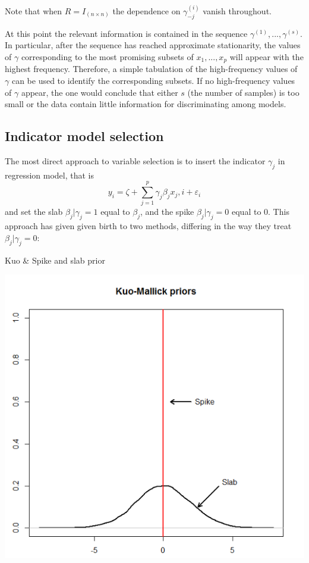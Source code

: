 \documentclass[11 pt]{article}
\begin{document}
\begin{multicols}{2}
\begin{enumerate}[noitemsep]
\begin{align*}
    \end{align*}
 Note that when $R = I_{(n\times n)}$ the dependence on $\gamma_{-j}^{(i)}$ vanish throughout.
\end{enumerate}
At this point the relevant information is contained in the sequence $\gamma^{(1)},...,\gamma^{(s)}$. In particular, after the sequence has reached approximate stationarity, the values of $\gamma$ corresponding to the most promising subsets of $x_1,...,x_p$ will appear with the highest frequency. Therefore, a simple tabulation of the high-frequency values of $\gamma$ can be used to identify the corresponding subsets. If no high-frequency values of $\gamma$ appear, the one would conclude that either $s$ (the number of samples) is too small or the data contain little information for discriminating among models.

\subsection{Indicator model selection} 
The most direct approach to variable selection is to insert the indicator $\gamma_j$ in regression model, that is
$$y_i = \zeta + \sum_{j=1}^p \gamma_j\beta_j x_j,i + \varepsilon_i$$
and set the slab $\beta_j | \gamma_j = 1$ equal to $\beta_j$, and the spike $\beta_j | \gamma_j = 0$ equal to 0. This approach has given given birth to two methods, differing in the way they treat $\beta_j | \gamma_j = 0$:

 
 \begin{figurehere}
\centering
\caption{Kuo \& Spike and slab prior}
    \includegraphics[width=\linewidth, keepaspectratio]{kuo.PNG}
\end{figurehere}
 

\end{multicols}
\end{document}
